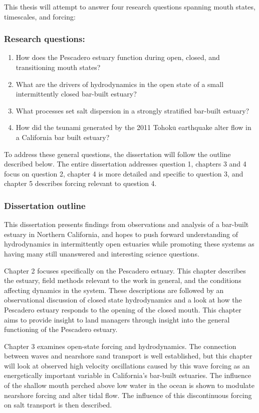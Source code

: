 This thesis will attempt to answer four research questions spanning mouth states, timescales, and forcing: 


\subsubsection{Research questions:}
\begin{enumerate}
	\item{How does the Pescadero estuary function during open, closed, and transitioning mouth states?}
	\item{What are the drivers of hydrodynamics in the open state of a small intermittently closed bar-built estuary?}
	\item{What processes set salt dispersion in a strongly stratified bar-built estuary?}
	\item{How did the tsunami generated by the 2011 Tohok$\overline{\mathrm{u}}$ earthquake alter flow in a California bar built estuary?}
\end{enumerate}

To address these general questions, the dissertation will follow the outline described below. The entire dissertation addresses question 1, chapters 3 and 4 focus on question 2, chapter 4 is more detailed and specific to question 3, and chapter 5 describes forcing relevant to question 4.

\subsubsection{Dissertation outline}

This dissertation presents findings from observations and analysis of a bar-built estuary in Northern California, and hopes to push forward understanding of hydrodynamics in intermittently open estuaries while promoting these systems as having many still unanswered and interesting science questions.

Chapter 2 focuses specifically on the Pescadero estuary. This chapter describes the estuary, field methods relevant to the work in general, and the conditions affecting dynamics in the system. These descriptions are followed by an observational discussion of closed state hydrodynamics and a look at how the Pescadero estuary responds to the opening of the closed mouth. This chapter aims to provide insight to land managers through insight into the general functioning of the Pescadero estuary.

Chapter 3 examines open-state forcing and hydrodynamics. The connection between waves and nearshore sand transport is well established, but this chapter will look at observed high velocity oscillations caused by this wave forcing as an energetically important variable in California's bar-built estuaries. The influence of the shallow mouth perched above low water in the ocean is shown to modulate nearshore forcing and alter tidal flow. The influence of this discontinuous forcing on salt transport is then described.

